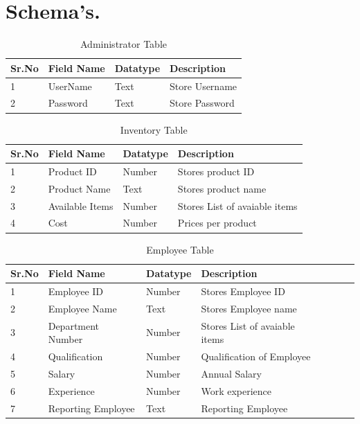 \documentclass[12pt,a4paper]{report}
\begin{document}
\chapter{Schema's.}%
\begin{table}[ht]
\begin{tabular}{| l | l | l | l |}
\hline
Sr.No & Field Name & Datatype & Description\\ \hline
1 & UserName & Text & Store Username\\ \hline
2 & Password & Text & Store Password \\ \hline
\end{tabular}
\caption{Administrator Table}
\end{table}

\begin{table}[ht]
\begin{tabular}{| l | l | l | l |}
\hline
Sr.No & Field Name & Datatype & Description\\ \hline
1 & Product ID & Number & Stores product ID\\ \hline
2 & Product Name & Text & Stores product name\\ \hline
3 & Available Items & Number &  Stores List of avaiable items\\ \hline
4 & Cost & Number & Prices per product \\ \hline
\end{tabular}
\caption{Inventory Table}
\end{table}

\begin{table}[ht]
\begin{tabular}{| l | l | l | l | l | l | l|}
\hline
Sr.No & Field Name & Datatype & Description\\ \hline
1 & Employee ID & Number & Stores Employee ID\\ \hline
2 & Employee Name & Text & Stores Employee name\\ \hline
3 & Department Number & Number &  Stores List of avaiable items\\ \hline
4 & Qualification & Number & Qualification of Employee \\ \hline
5 & Salary & Number & Annual Salary \\ \hline
6 & Experience & Number & Work experience \\ \hline
7 & Reporting Employee & Text & Reporting Employee \\ \hline
\end{tabular}
\caption{Employee Table}
\end{table}
\end{document}
